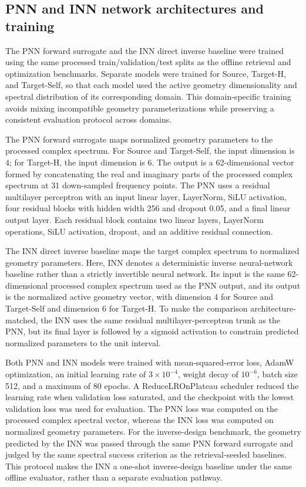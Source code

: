 \documentclass[final,1p,times]{elsarticle}
\begin{document}
\subsection{PNN and INN network architectures and training}

The PNN forward surrogate and the INN direct inverse baseline were trained using the same processed train/validation/test splits as the offline retrieval and optimization benchmarks. Separate models were trained for Source, Target-H, and Target-Self, so that each model used the active geometry dimensionality and spectral distribution of its corresponding domain. This domain-specific training avoids mixing incompatible geometry parameterizations while preserving a consistent evaluation protocol across domains.

The PNN forward surrogate maps normalized geometry parameters to the processed complex spectrum. For Source and Target-Self, the input dimension is 4; for Target-H, the input dimension is 6. The output is a 62-dimensional vector formed by concatenating the real and imaginary parts of the processed complex spectrum at 31 down-sampled frequency points. The PNN uses a residual multilayer perceptron with an input linear layer, LayerNorm, SiLU activation, four residual blocks with hidden width 256 and dropout 0.05, and a final linear output layer. Each residual block contains two linear layers, LayerNorm operations, SiLU activation, dropout, and an additive residual connection.

The INN direct inverse baseline maps the target complex spectrum to normalized geometry parameters. Here, INN denotes a deterministic inverse neural-network baseline rather than a strictly invertible neural network. Its input is the same 62-dimensional processed complex spectrum used as the PNN output, and its output is the normalized active geometry vector, with dimension 4 for Source and Target-Self and dimension 6 for Target-H. To make the comparison architecture-matched, the INN uses the same residual multilayer-perceptron trunk as the PNN, but its final layer is followed by a sigmoid activation to constrain predicted normalized parameters to the unit interval.

Both PNN and INN models were trained with mean-squared-error loss, AdamW optimization, an initial learning rate of $3\times10^{-4}$, weight decay of $10^{-6}$, batch size 512, and a maximum of 80 epochs. A ReduceLROnPlateau scheduler reduced the learning rate when validation loss saturated, and the checkpoint with the lowest validation loss was used for evaluation. The PNN loss was computed on the processed complex spectral vector, whereas the INN loss was computed on normalized geometry parameters. For the inverse-design benchmark, the geometry predicted by the INN was passed through the same PNN forward surrogate and judged by the same spectral success criterion as the retrieval-seeded baselines. This protocol makes the INN a one-shot inverse-design baseline under the same offline evaluator, rather than a separate evaluation pathway.
\end{document}
